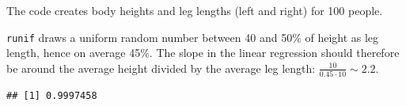 \documentclass[
]{book}
\newenvironment{Shaded}{\begin{snugshade}}{\end{snugshade}}
\newcommand{\AttributeTok}[1]{\textcolor[rgb]{0.13,0.29,0.53}{#1}}
\newcommand{\DecValTok}[1]{\textcolor[rgb]{0.00,0.00,0.81}{#1}}
\newcommand{\FloatTok}[1]{\textcolor[rgb]{0.00,0.00,0.81}{#1}}
\newcommand{\FunctionTok}[1]{\textcolor[rgb]{0.13,0.29,0.53}{\textbf{#1}}}
\newcommand{\NormalTok}[1]{#1}
\newcommand{\OtherTok}[1]{\textcolor[rgb]{0.56,0.35,0.01}{#1}}
\newcommand{\SpecialCharTok}[1]{\textcolor[rgb]{0.81,0.36,0.00}{\textbf{#1}}}
\begin{document}
The code creates body heights and leg lengths (left and right) for 100 people.

\texttt{runif} draws a uniform random number between 40 and 50\% of height as leg length, hence on average 45\%.
The slope in the linear regression should therefore be around the average height divided by the average leg length:
\(\frac{10}{0.45 \cdot 10} \sim 2.2\).

\begin{Shaded}
\end{Shaded}

\begin{verbatim}
## [1] 0.9997458
\end{verbatim}
\end{document}
